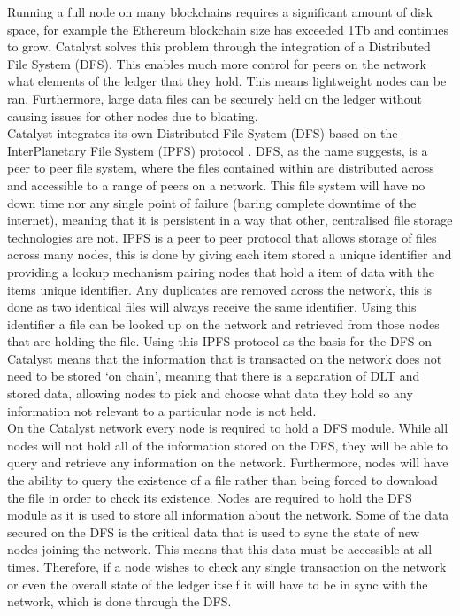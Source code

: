 Running a full node on many blockchains requires a significant amount of disk space, for example the Ethereum blockchain size has exceeded 1Tb \cite{EthBloat} and continues to grow. Catalyst solves this problem through the integration of a Distributed File System (DFS). This enables much more control for peers on the network what elements of the ledger that they hold. This means lightweight nodes can be ran. Furthermore, large data files can be securely held on the ledger without causing issues for other nodes due to bloating. \\

Catalyst integrates its own Distributed File System (DFS) \cite{DFS} based on the InterPlanetary File System (IPFS) protocol \cite{benet2014ipfs}. DFS, as the name suggests, is a peer to peer file system, where the files contained within are distributed across and accessible to a range of peers on a network. This file system will have no down time nor any single point of failure (baring complete downtime of the internet), meaning that it is persistent in a way that other, centralised file storage technologies are not. IPFS is a peer to peer protocol that allows storage of files across many nodes, this is done by giving each item stored a unique identifier and providing a lookup mechanism pairing nodes that hold a item of data with the items unique identifier. Any duplicates are removed across the network, this is done as two identical files will always receive the same identifier. Using this identifier a file can be looked up on the network and retrieved from those nodes that are holding the file. Using this IPFS protocol as the basis for the DFS on Catalyst means that the information that is transacted on the network does not need to be stored `on chain', meaning that there is a separation of DLT and stored data, allowing nodes to pick and choose what data they hold so any information not relevant to a particular node is not held. \\ %

On the Catalyst network every node is required to hold a DFS module. While all nodes will not hold all of the information stored on the DFS, they will be able to query and retrieve any information on the network. Furthermore, nodes will have the ability to query the existence of a file rather than being forced to download the file in order to check its existence. Nodes are required to hold the DFS module as it is used to store all information about the network.  Some of the data secured on the DFS is the critical data that is used to sync the state of new nodes joining the network. This means that this data must be accessible at all times. Therefore, if a node wishes to check any single transaction on the network or even the overall state of the ledger itself it will have to be in sync with the network, which is done through the DFS.  \\ %

